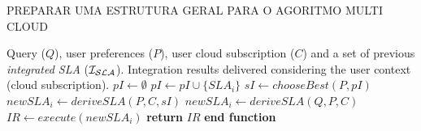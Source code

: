 PREPARAR UMA ESTRUTURA GERAL PARA O AGORITMO MULTI CLOUD
\begin{algorithm} 
\caption{ - \ldots}
\label{qualityBasedAlgorithm}
\begin{algorithmic}[1]
\REQUIRE Query ($Q$), user preferences ($P$), user cloud subscription ($C$) and a set of previous \textit{integrated SLA} ($\bigSLA$).
\ENSURE Integration results delivered considering the user context (cloud subscription).
\STATE $pI \leftarrow \emptyset$
		\STATE $pI \leftarrow pI \cup \lbrace SLA_{i} \rbrace$		
	\ENDIF
\ENDFOR
{}
	\STATE $sI \leftarrow chooseBest(P, pI)$
	\STATE $newSLA_{i} \leftarrow deriveSLA(P, C, sI)$
\ELSE
	\STATE $newSLA_{i} \leftarrow deriveSLA(Q, P, C)$
\ENDIF
\STATE $IR \leftarrow execute(newSLA_{i})$
\STATE \textbf{return} $IR$
\STATE \textbf{end function}
\end{algorithmic}
\end{algorithm} 